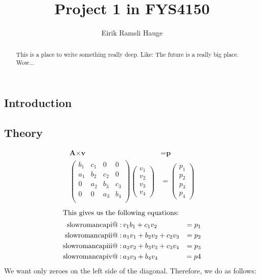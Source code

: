 \documentclass[12pt,a4paper]{article}
\author{Eirik Ramsli Hauge}
\title{Project 1 in FYS4150}
\makeatletter
\newcommand*{\rom}[1]{\expandafter\@slowromancap\romannumeral #1@}
\newcommand{\V}[1]{\textbf{#1}}
\makeatother
\begin{document}
	\maketitle
	
\begin{abstract}
This is a place to write something really deep. Like: The future is a really big place. Wow...
\end{abstract}
\subsection*{Introduction}
\subsection*{Theory}
\begin{align*}
\V{A}\times \V{v} &= \V{p} \\
\begin{pmatrix}
b_1 & c_1 & 0 & 0 \\
a_1 & b_2 & c_2 & 0 \\
0 & a_2 & b_3 & c_3 \\
0 & 0 & a_3 & b_4 \\
\end{pmatrix}
\begin{pmatrix}
v_1 \\ v_2 \\ v_3 \\ v_4
\end{pmatrix} &= 
\begin{pmatrix}
p_1 \\ p_2 \\ p_3 \\ p_4
\end{pmatrix}
\end{align*}
\begin{align*}
\intertext{This gives us the following equations:}
\text{\rom{1}}:& \, v_1b_1 + c_1v_2 &= p_1 \\
\text{\rom{2}}:& \, a_1v_1 + b_2v_2 + c_2v_3 &= p_2 \\
\text{\rom{3}}:& \, a_2v_2 + b_3v_3 + c_3v_4 &= p_3 \\
\text{\rom{4}}:& \, a_3v_3 + b_4v_4 &= p4 \\
\end{align*}
We want only zeroes on the left side of the diagonal. Therefore, we do as follows:
\end{document}
